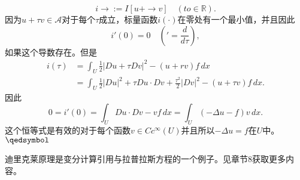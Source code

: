\documentclass[leqno]{article}
\numberwithin{equation}{subsection}%
\begin{document}
\begin{equation*}
i{\to}:=I[u+\to v]\quad(to\in\mathbb{R}).
\end{equation*}
因为$u+\tau v\in\mathcal{A}$对于每个$\tau$成立，标量函数$i(\cdot)$在零处有一个最小值，并且因此
\begin{equation*}
i'(0)=0\quad\left('=\frac{d}{d\tau}\right),
\end{equation*}
如果这个导数存在。但是
\begin{equation*}
\begin{aligned}
i(\tau)&=\int_{U}\frac{1}{2}|Du+\tau Dv|^{2}-(u+rv)f\,dx\\
&=\int_{U}\frac{1}{2}|Du|^{2}+\tau Du\cdot Dv+\frac{\tau^{2}}{2}|Dv|^{2}-(u+\tau v)f\,dx.
\end{aligned}
\end{equation*}
因此
\begin{equation*}
0=i'(0)=\int_{U}Du\cdot Dv-vf\,dx=\int_{U}(-\Delta u-f)v\,dx.
\end{equation*}
这个恒等式是有效的对于每个函数$v\in C{c}^{\infty}(U)$并且所以$-\Delta u=f$在$U$中。$\hfill\qedsymbol$
\par
迪里克莱原理是变分计算引用与拉普拉斯方程的一个例子。见章节8获取更多内容。
\end{document}
